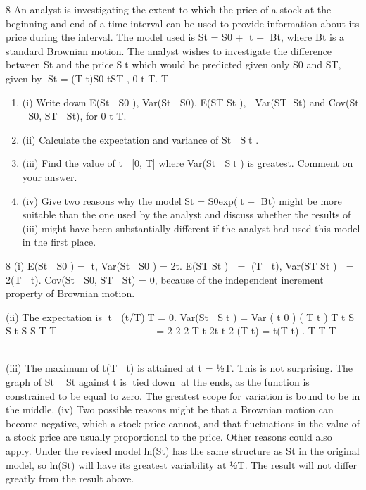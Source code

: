 \documentclass[a4paper,12pt]{article}
\begin{document}
\begin{enumerate}

8 An analyst is investigating the extent to which the price of a stock at the beginning and end of a time interval can be used to provide information about its price during
the interval. The model used is
St = S0 + t + Bt,
where Bt is a standard Brownian motion. The analyst wishes to investigate the difference between St and the price St which would be predicted given only S0 and ST, given by
St = (T t)S0 tST , 0 t T.
T
 
 
\begin{enumerate}
\item (i) Write down E(St  S0 ), Var(St  S0), E(ST St ),  Var(ST St) and
Cov(St  S0, ST  St), for 0 
 t 
 T. 
\item (ii) Calculate the expectation and variance of St  St . 
\item (iii) Find the value of t  [0, T] where Var(St  St ) is greatest. Comment on your
answer. 

\item (iv) Give two reasons why the model
St = S0exp(t + Bt)
might be more suitable than the one used by the analyst and discuss whether the results of (iii) might have been substantially different if the analyst had used this model in the first place. 
\end{enumerate}


8 (i) E(St  S0 ) = t, Var(St  S0 ) =	
2t.
E(ST St )  = (T  t), Var(ST St )  = 	2(T  t).
Cov(St  S0, ST  St) = 0, because of the independent increment property of
Brownian motion.

(ii) The expectation is t  (t/T)T = 0.
Var(St  St ) = Var ( t 0 ) ( T t )
T t S S t S S
T T
    
      
   
=
2 2 2
T t 2t t 2 (T t) = t(T t) .
T T T
      
       
 	  	

(iii) The maximum of t(T  t) is attained at t = ½T.
This is not surprising. The graph of St  St against t is tied down at the ends,
as the function is constrained to be equal to zero. The greatest scope for
variation is bound to be in the middle.
(iv) Two possible reasons might be that a Brownian motion can become negative,
which a stock price cannot, and that fluctuations in the value of a stock price
are usually proportional to the price. Other reasons could also apply.
Under the revised model ln(St) has the same structure as St in the original
model, so ln(St) will have its greatest variability at ½T. The result will not
differ greatly from the result above.


\end{enumerate}
\end{document}
